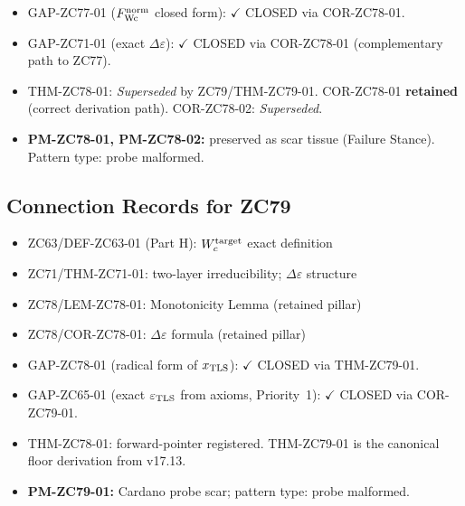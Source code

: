 \documentclass[12pt, a4paper]{article}
\begin{document}
\begin{correctionbox}[title={ZC78 --- Forward Corrections / Scar Record}]
\begin{itemize}[noitemsep, leftmargin=1.5em]
  \item GAP-ZC77-01 ($F_{\rm Wc}^{\rm norm}$ closed form):
    \textcolor{crfgreen}{$\checkmark$ CLOSED} via COR-ZC78-01.
  \item GAP-ZC71-01 (exact $\Delta\varepsilon$):
    \textcolor{crfgreen}{$\checkmark$ CLOSED} via COR-ZC78-01
    (complementary path to ZC77).
  \item THM-ZC78-01: \textit{Superseded} by ZC79/THM-ZC79-01.
    COR-ZC78-01 \textbf{retained} (correct derivation path).
    COR-ZC78-02: \textit{Superseded}.
  \item \textbf{PM-ZC78-01, PM-ZC78-02:} preserved as scar tissue
    (Failure Stance). Pattern type: probe malformed.
\end{itemize}
\end{correctionbox}

\subsection{Connection Records for ZC79}

\begin{inheritbox}[title={ZC79 --- Backward Inheritance from Parts A--I}]
\begin{itemize}[noitemsep, leftmargin=1.5em]
  \item ZC63/DEF-ZC63-01 (Part H): $W_c^{\rm target}$ exact definition
  \item ZC71/THM-ZC71-01: two-layer irreducibility; $\Delta\varepsilon$ structure
  \item ZC78/LEM-ZC78-01: Monotonicity Lemma (retained pillar)
  \item ZC78/COR-ZC78-01: $\Delta\varepsilon$ formula (retained pillar)
\end{itemize}
\end{inheritbox}

\begin{correctionbox}[title={ZC79 --- Forward Corrections / Gap Closures}]
\begin{itemize}[noitemsep, leftmargin=1.5em]
  \item GAP-ZC78-01 (radical form of $x_{\rm TLS}$):
    \textcolor{crfgreen}{$\checkmark$ CLOSED} via THM-ZC79-01.
  \item GAP-ZC65-01 (exact $\varepsilon_{\rm TLS}$ from axioms, Priority~1):
    \textcolor{crfgreen}{$\checkmark$ CLOSED} via COR-ZC79-01.
  \item THM-ZC78-01: forward-pointer registered.
    THM-ZC79-01 is the canonical floor derivation from v17.13.
  \item \textbf{PM-ZC79-01:} Cardano probe scar; pattern type: probe malformed.
\end{itemize}
\end{correctionbox}
\end{document}
